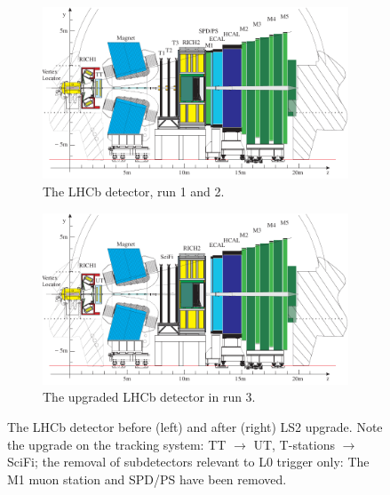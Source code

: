 \begin{figure}[!htb]
    \centering
    \begin{subfigure}[t]{0.45\textwidth}
        \centering
        \includegraphics[width=\textwidth]{./figs-detector/lhcb_detector_view.pdf}
        \caption{The LHCb detector, run 1 and 2.}
    \end{subfigure}
    \hspace{12pt}
    \begin{subfigure}[t]{0.45\textwidth}
        \centering
        \includegraphics[width=\textwidth]{./figs-lhcb-upgrade-overview/lhcb_detector_view_run3.pdf}
        \caption{The upgraded LHCb detector in run 3.}
    \end{subfigure}

    \caption{
        The LHCb detector before (left) and after (right) LS2 upgrade.
        Note the upgrade on the tracking system:
        TT $\rightarrow$ UT, T-stations $\rightarrow$ SciFi;
        the removal of subdetectors relevant to L0 trigger only:
        The M1 muon station and SPD/PS have been removed.
    }
    \label{fig:lhcb-detector-comparison}
\end{figure}

